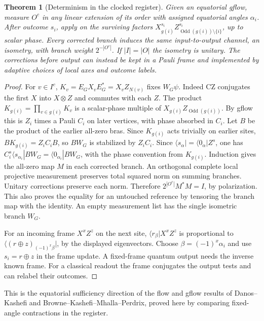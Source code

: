 \documentclass[aps,pra,onecolumn,superscriptaddress,nofootinbib,10pt]{revtex4-2}
\newtheorem{theorem}{Theorem}
\theoremstyle{definition}
\theoremstyle{remark}
\begin{document}
\begin{theorem}[Determinism in the clocked register]\label{cp:determinism}
Given an equatorial gflow, measure $O^c$ in any linear extension of its order with assigned equatorial angles $\alpha_i$. After outcome $s_i$, apply on the surviving factors $X_{g(i)}^{s_i}Z_{\operatorname{Odd}(g(i))\setminus\{i\}}^{s_i}$, up to scalar phase. Every corrected branch induces the same input-to-output channel, an isometry, with branch weight $2^{-|O^c|}$. If $|I|=|O|$ the isometry is unitary. The corrections before output can instead be kept in a Pauli frame and implemented by adaptive choices of local axes and outcome labels.
\end{theorem}
\begin{proof}
For $v\in I^c$, $K_v=E_GX_vE_G^*=X_v Z_{N(v)}$ fixes $W_G\psi$. Indeed $\mathrm{CZ}$ conjugates the first $X$ into $X\otimes Z$ and commutes with each $Z$. The product $K_{g(i)}=\prod_{v\in g(i)}K_v$ is a scalar-phase multiple of $X_{g(i)}Z_{\operatorname{Odd}(g(i))}$. By gflow this is $Z_i$ times a Pauli $C_i$ on later vertices, with phase absorbed in $C_i$. Let $B$ be the product of the earlier all-zero bras. Since $K_{g(i)}$ acts trivially on earlier sites, $B K_{g(i)}=Z_i C_i B$, so $B W_G$ is stabilized by $Z_i C_i$. Since $\langle s_\alpha|=\langle 0_\alpha|Z^s$, one has $C_i^s\langle s_{\alpha_i}|BW_G=\langle0_{\alpha_i}|BW_G$, with the phase convention from $K_{g(i)}$. Induction gives the all-zero map $M$ in each corrected branch. An orthogonal complete local projective measurement preserves total squared norm on summing branches. Unitary corrections preserve each norm. Therefore $2^{|O^c|}M^*M=I$, by polarization. This also proves the equality for an untouched reference by tensoring the branch map with the identity. An empty measurement list has the single isometric branch $W_G$.

For an incoming frame $X^xZ^z$ on the next site,
$\langle r_\beta|X^xZ^z$ is proportional to
$\langle(r\oplus z)_{(-1)^x\beta}|$, by the displayed eigenvectors. Choose $\beta=(-1)^x\alpha_i$ and use $s_i=r\oplus z$ in the frame update. A fixed-frame quantum output needs the inverse known frame. For a classical readout the frame conjugates the output tests and can relabel their outcomes.
\end{proof}

This is the equatorial sufficiency direction of the flow and gflow results of Danos--Kashefi and Browne--Kashefi--Mhalla--Perdrix, proved here by comparing fixed-angle contractions in the register. \cite{n5-flow,n5-gflow}
\end{document}
